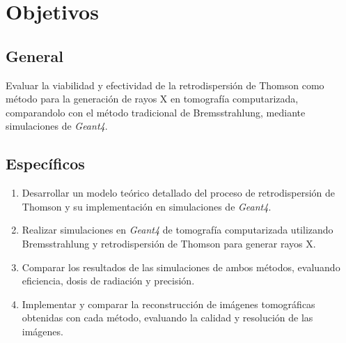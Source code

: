 \vspace*{\fill}


\section{Objetivos}

\subsection{General}
Evaluar la viabilidad y efectividad de la retrodispersión de Thomson como método para la generación de rayos X en tomografía computarizada, comparandolo con el método tradicional de Bremsstrahlung, mediante simulaciones de \textit{Geant4}.

\subsection{Específicos}
\begin{enumerate}
    \item Desarrollar un modelo teórico detallado del proceso de retrodispersión de Thomson y su implementación en simulaciones de \textit{Geant4}.
    \item Realizar simulaciones en \textit{Geant4} de tomografía computarizada utilizando Bremsstrahlung y retrodispersión de Thomson para generar rayos X.
    \item Comparar los resultados de las simulaciones de ambos métodos, evaluando eficiencia, dosis de radiación y precisión.
    \item Implementar y comparar la reconstrucción de imágenes tomográficas obtenidas con cada método, evaluando la calidad y resolución de las imágenes.
\end{enumerate}


\vspace*{\fill}